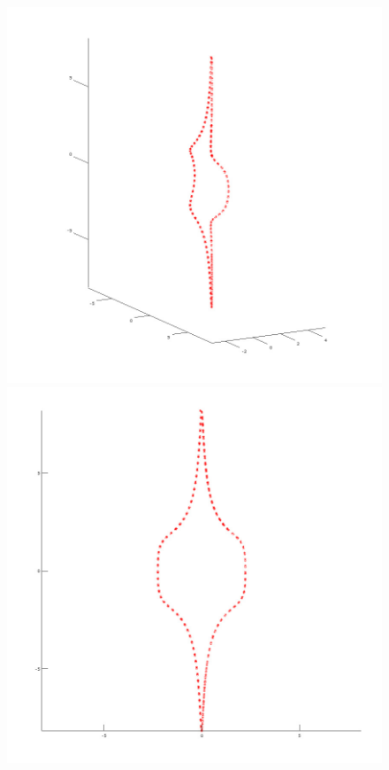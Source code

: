 \documentclass[12pt]{article}
\begin{document}
\begin{minipage}{\textwidth}
\begin{figure}[H]
    	\includegraphics[scale=0.3]{primer4_4}
    	\includegraphics[scale=0.3]{primer4_3}
	\end{figure}
	\end{minipage}
	
\end{document}
